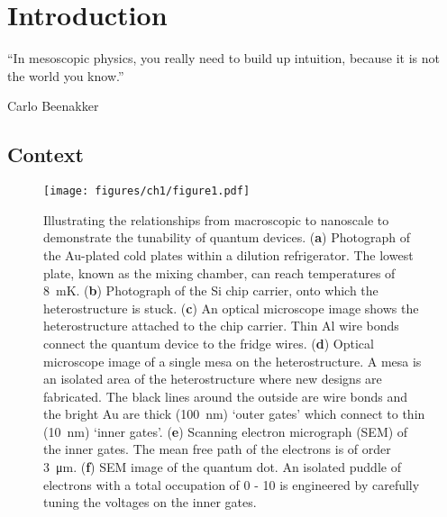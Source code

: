 \chapter{Introduction}\label{cha:intro}
\epigraph{``In mesoscopic physics, you really need to build up intuition, because it is not the world you know.''}{Carlo Beenakker~\cite{beenaker_quote}}



\section{Context}

\begin{figure}[!htb]
 \begin{center}
 \texttt{[image: figures/ch1/figure1.pdf]}
 \caption[Fridge to Quantum Dot Scale Illustration]{\label{fig:ch1/scale_breakdown} 
Illustrating the relationships from macroscopic to nanoscale to demonstrate the tunability of quantum devices. (\textbf{a}) Photograph of the Au-plated cold plates within a dilution refrigerator. The lowest plate, known as the mixing chamber, can reach temperatures of \qty{8}{mK}. (\textbf{b}) Photograph of the Si chip carrier, onto which the heterostructure is stuck. (\textbf{c}) An optical microscope image shows the heterostructure attached to the chip carrier. Thin Al wire bonds connect the quantum device to the fridge wires. (\textbf{d}) Optical microscope image of a single mesa on the heterostructure. A mesa is an isolated area of the heterostructure where new designs are fabricated. The black lines around the outside are wire bonds and the bright Au are thick (\qty{100}{nm}) `outer gates' which connect to thin (\qty{10}{nm}) `inner gates'. (\textbf{e}) Scanning electron micrograph (SEM) of the inner gates. The mean free path of the electrons is of order \qty{3}{\micro m}. (\textbf{f}) SEM image of the quantum dot. An isolated puddle of electrons with a total occupation of 0 - 10 is engineered by carefully tuning the voltages on the inner gates. 
}
 \end{center}
\end{figure}




